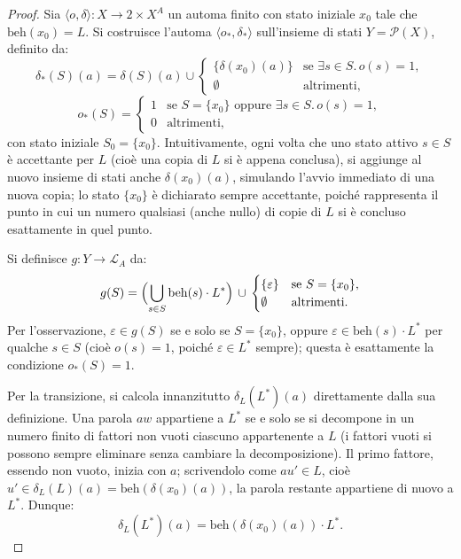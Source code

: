 \begin{proof}
  Sia \(\langle o, \delta \rangle : X \to 2 \times X^A\) un automa finito con stato iniziale \(x_0\) tale che \(\mathrm{beh}(x_0) = L\). Si costruisce l'automa \(\langle o_*, \delta_* \rangle\) sull'insieme di stati \(Y = \mathcal{P}(X)\), definito da:
  \[
    \delta_*(S)(a) = \delta(S)(a) \cup \begin{cases} \{\delta(x_0)(a)\} & \text{se } \exists s \in S.\, o(s) = 1, \\ \emptyset & \text{altrimenti,} \end{cases} \]
  \[
    o_*(S) = \begin{cases} 1 & \text{se } S = \{x_0\} \text{ oppure } \exists s \in S.\, o(s) = 1, \\ 0 & \text{altrimenti,} \end{cases}
  \]
  con stato iniziale \(S_0 = \{x_0\}\). Intuitivamente, ogni volta che uno stato attivo \(s \in S\) è accettante per \(L\) (cioè una copia di \(L\) si è appena conclusa), si aggiunge al nuovo insieme di stati anche \(\delta(x_0)(a)\), simulando l'avvio immediato di una nuova copia; lo stato \(\{x_0\}\) è dichiarato sempre accettante, poiché rappresenta il punto in cui un numero qualsiasi (anche nullo) di copie di \(L\) si è concluso esattamente in quel punto.

  Si definisce \(g : Y \to \mathcal{L}_A\) da:
  \[
    g(S) = \Bigl(\bigcup_{s \in S} \mathrm{beh}(s) \cdot L^*\Bigr) \,\cup\, \begin{cases} \{\varepsilon\} & \text{se } S = \{x_0\}, \\ \emptyset & \text{altrimenti.} \end{cases}
  \]
  Per l'osservazione, \(\varepsilon \in g(S)\) se e solo se \(S = \{x_0\}\), oppure \(\varepsilon \in \mathrm{beh}(s) \cdot L^*\) per qualche \(s \in S\) (cioè \(o(s) = 1\), poiché \(\varepsilon \in L^*\) sempre); questa è esattamente la condizione \(o_*(S) = 1\).

  Per la transizione, si calcola innanzitutto \(\delta_L(L^*)(a)\) direttamente dalla sua definizione. Una parola \(aw\) appartiene a \(L^*\) se e solo se si decompone in un numero finito di fattori non vuoti ciascuno appartenente a \(L\) (i fattori vuoti si possono sempre eliminare senza cambiare la decomposizione). Il primo fattore, essendo non vuoto, inizia con \(a\); scrivendolo come \(a u' \in L\), cioè \(u' \in \delta_L(L)(a) = \mathrm{beh}(\delta(x_0)(a))\), la parola restante appartiene di nuovo a \(L^*\). Dunque:
  \[
    \delta_L(L^*)(a) = \mathrm{beh}(\delta(x_0)(a)) \cdot L^*.
  \]


\end{proof}
